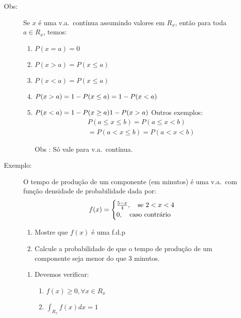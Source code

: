 \documentclass[11pt,a4paper]{book}
\begin{document}
\begin{description}
\begin{figure}[htpb]
       \end{figure}
     \item [Obs:] Se $x$ é uma v.a.\ contínua assumindo valores em $R_{x}$, então para toda 
       $a \in R_{x}$, temos: 
       \begin{enumerate}[label=(\alph*)]
         \item $P(x=a)=0$
         \item $P(x>a)=P(x\leq a)$
         \item $P(x<a)=P(x\le a)$
         \item $P(x>a)=1- P(x \le a)\\ = 1-P(x<a)$
         \item $P(x<a)=1-P(x \geq a)\\ 1-P(x>a)$
           Outros exemplos: 
           \begin{align}
             P(a\le x \le b)= P(a\le x < b)\\
             = P(a<x \le b)= P(a<x<b)
           \end{align}
         \item [Obs]: Só vale para v.a.\ contínua. 
       \end{enumerate}
     \item [Exemplo:] 
       O tempo de produção de um componente (em minutos) é uma v.a.\ com função densidade 
       de probabilidade dada por: 
       \begin{align}
         f(x)=
         \begin{cases}
           \frac{5-x}{4}, \text{\quad se $2<x<4$}\\
           0,\text{\quad caso contrário} 
         \end{cases}
       \end{align}
       \begin{enumerate}[label=(\alph*)]
         \item Mostre que $f(x)$ é uma f.d.p
         \item Calcule a probabilidade de que o tempo de produção de um componente 
           seja menor do que 3 minutos.
       \end{enumerate}
       \begin{enumerate}[label=(\alph*)]
         \item Devemos verificar: 
           \begin{enumerate}[leftmargin=*, label=\Roman*., widest=IV, align=left] %
             \item $f(x)\geq 0, \forall x \in R_{x}$
             \item $\int_{R_{x}} f(x)dx=1$


\end{enumerate}
\end{enumerate}
\end{description}
\end{document}

